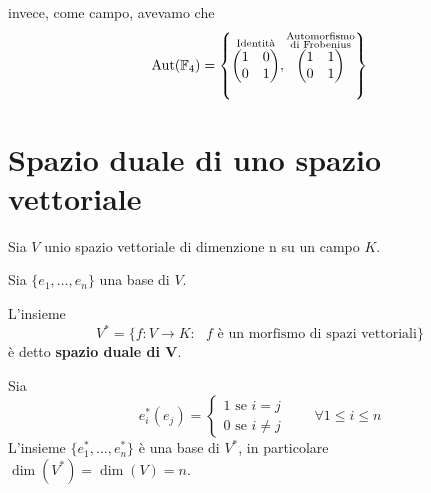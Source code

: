\documentclass[../main.tex]{subfiles}
\begin{document}
\begin{example}
    invece, come campo, avevamo che
    \begin{equation*}
        \operatorname{Aut}(\mathbb{F}_4) = \left\{
        \overset{\text{Identità}}{
            \begin{pmatrix}
                1 & 0 \\
                0 & 1
            \end{pmatrix}
        }
        ,
        \overset{\substack{\text{Automorfismo}\\\text{di Frobenius}}}{
            \begin{pmatrix}
                1 & 1 \\
                0 & 1
            \end{pmatrix}
        }
        \right\}
    \end{equation*}
\end{example}

\section{Spazio duale di uno spazio vettoriale}
\begin{definition}
    Sia $V$ unio spazio vettoriale di dimenzione n su un campo $K$.

    Sia $\{e_1, \ldots, e_n\}$ una base di $V$.

    L'insieme
    \begin{equation*}
        V^* = \{f : V \rightarrow K : \text{ $f$ è un morfismo di spazi vettoriali} \}
    \end{equation*}
    è detto \textbf{spazio duale di V}.

    Sia
    \begin{equation*}
        e^*_i(e_j)= \begin{cases}
            1 \text{ se } i = j \\
            0 \text{ se } i \neq j
        \end{cases} \qquad \forall 1 \leq i \leq n
    \end{equation*}
    L'insieme $\{e^*_1, \ldots, e^*_n\}$ è una base di $V^*$, in particolare $\dim(V^*) = \dim(V) = n$.
\end{definition}
\end{document}
